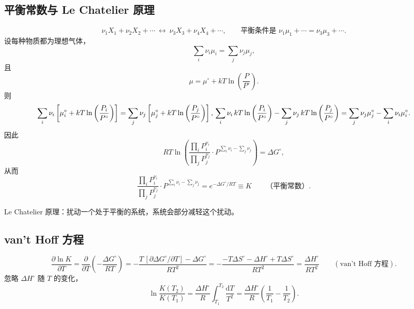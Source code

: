 \subsection{平衡常数与 Le Chatelier 原理}
\begin{equation}
    \nu_1X_1+\nu_2X_2+\cdots\ \longleftrightarrow\ \nu_3X_3+\nu_4X_4+\cdots,
    \qquad \text{平衡条件是 }\nu_1\mu_1+\cdots=\nu_3\mu_3+\cdots.
\end{equation}
设每种物质都为理想气体，
\begin{equation}
    \sum_i \nu_i\mu_i=\sum_j \nu_j\mu_j,
\end{equation}
且
\begin{equation}
    \mu=\mu^\circ+kT\ln\left(\frac{P}{P^\circ}\right).
\end{equation}
则
\begin{equation}
    \sum_i \nu_i\left[\mu_i^\circ+kT\ln\left(\frac{P_i}{P^\circ}\right)\right]
    =\sum_j \nu_j\left[\mu_j^\circ+kT\ln\left(\frac{P_j}{P^\circ}\right)\right],\\
    \sum_i \nu_i\,kT\ln\left(\frac{P_i}{P^\circ}\right)-\sum_j \nu_j\,kT\ln\left(\frac{P_j}{P^\circ}\right)
    =\sum_j \nu_j\mu_j^\circ-\sum_i \nu_i\mu_i^\circ.
\end{equation}
因此
\begin{equation}
    RT\ln\left(\frac{\prod_i P_i^{\nu_i}}{\prod_j P_j^{\nu_j}}\cdot P^{\sum_i\nu_i-\sum_j\nu_j}\right)=\Delta G^\circ,
\end{equation}
从而
\begin{equation}
    \frac{\prod_i P_i^{\nu_i}}{\prod_j P_j^{\nu_j}}\cdot P^{\sum_i\nu_i-\sum_j\nu_j}
    =e^{-\Delta G^\circ/RT}\equiv K\qquad \text{（平衡常数）}.
\end{equation}

Le Chatelier 原理：扰动一个处于平衡的系统，系统会部分减轻这个扰动。

\subsection{van't Hoff 方程}
\begin{equation}
    \frac{\partial \ln K}{\partial T}
    =\frac{\partial}{\partial T}\left(-\frac{\Delta G^\circ}{RT}\right)
    =-\frac{T\,[\partial \Delta G^\circ/\partial T]-\Delta G^\circ}{RT^2}
    =-\frac{-T\Delta S^\circ-\Delta H^\circ+T\Delta S^\circ}{RT^2}
    =\frac{\Delta H^\circ}{RT^2}\qquad (\text{van't Hoff 方程}).
\end{equation}
忽略 $\Delta H^\circ$ 随 $T$ 的变化，
\begin{equation}
    \ln\frac{K(T_2)}{K(T_1)}=\frac{\Delta H^\circ}{R}\int_{T_1}^{T_2}\frac{\mathrm{d}T}{T^2}
    =\frac{\Delta H^\circ}{R}\left(\frac{1}{T_1}-\frac{1}{T_2}\right).
\end{equation}


